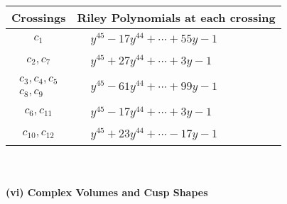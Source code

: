 \documentclass[1p]{elsarticle_modified}
\theoremstyle{definition}
\begin{document}
\begin{tabular}{m{50pt}|m{274pt}}
Crossings & \hspace{64pt}Riley Polynomials at each crossing \\
\hline $$\begin{aligned}c_{1}\end{aligned}$$&$\begin{aligned}
&y^{45}-17 y^{44}+\cdots+55 y-1
\end{aligned}$\\
\hline $$\begin{aligned}c_{2},c_{7}\end{aligned}$$&$\begin{aligned}
&y^{45}+27 y^{44}+\cdots+3 y-1
\end{aligned}$\\
\hline $$\begin{aligned}c_{3},c_{4},c_{5}\\c_{8},c_{9}\end{aligned}$$&$\begin{aligned}
&y^{45}-61 y^{44}+\cdots+99 y-1
\end{aligned}$\\
\hline $$\begin{aligned}c_{6},c_{11}\end{aligned}$$&$\begin{aligned}
&y^{45}-17 y^{44}+\cdots+3 y-1
\end{aligned}$\\
\hline $$\begin{aligned}c_{10},c_{12}\end{aligned}$$&$\begin{aligned}
&y^{45}+23 y^{44}+\cdots-17 y-1
\end{aligned}$\\
\hline
\end{tabular}\\~\\
\newpage\flushleft \textbf{(vi) Complex Volumes and Cusp Shapes}
\end{document}
